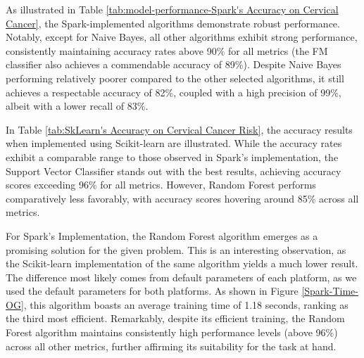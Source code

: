 \documentclass[12pt]{report}
\begin{document}



As illustrated in Table \ref{tab:model-performance-Spark's Accuracy on Cervical Cancer}, the Spark-implemented algorithms demonstrate robust performance. Notably, except for Naive Bayes, all other algorithms exhibit strong performance, consistently maintaining accuracy rates above 90\% for all metrics (the FM classifier also achieves a commendable accuracy of 89\%). Despite Naive Bayes performing relatively poorer compared to the other selected algorithms, it still achieves a respectable accuracy of 82\%, coupled with a high precision of 99\%, albeit with a lower recall of 83\%.

In Table \ref{tab:SkLearn's Accuracy on Cervical Cancer Risk}, the accuracy results when implemented using Scikit-learn are illustrated. While the accuracy rates exhibit a comparable range to those observed in Spark's implementation, the Support Vector Classifier stands out with the best results, achieving accuracy scores exceeding 96\% for all metrics. However, Random Forest performs comparatively less favorably, with accuracy scores hovering around 85\% across all metrics.

For Spark's Implementation, the Random Forest algorithm emerges as a promising solution for the given problem. This is an interesting observation, as the Scikit-learn implementation of the same algorithm yields a much lower result. The difference most likely comes from default parameters of each platform, as we used the default parameters for both platforms. As shown in Figure \ref{Spark-Time-OG}, this algorithm boasts an average training time of 1.18 seconds, ranking as the third most efficient. Remarkably, despite its efficient training, the Random Forest algorithm maintains consistently high performance levels (above 96\%) across all other metrics, further affirming its suitability for the task at hand.
\end{document}
